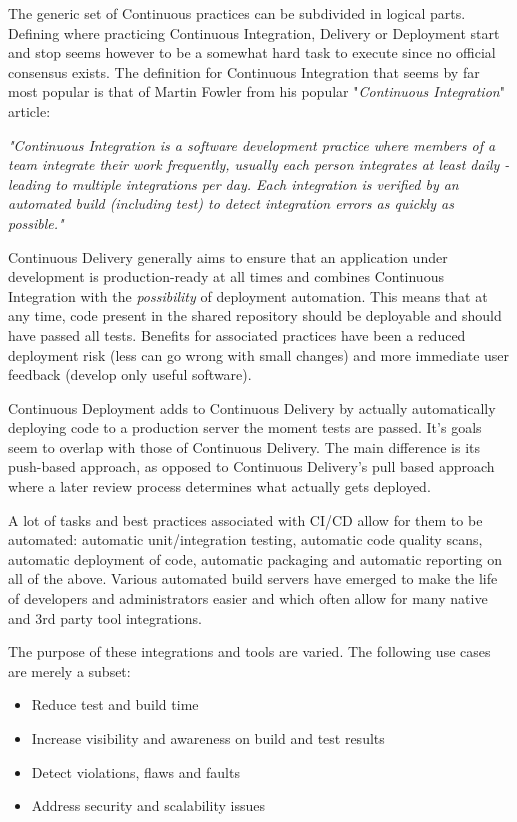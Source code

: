 The generic set of Continuous practices can be subdivided in logical parts. Defining where practicing Continuous Integration, Delivery or Deployment start and stop seems however to be a somewhat hard task to execute since no official consensus exists. The definition for Continuous Integration that seems by far most popular is that of Martin Fowler from his popular "\textit{Continuous Integration}" article:

\textit{"Continuous Integration is a software development practice where members of a team integrate their work frequently, usually each person integrates at least daily - leading to multiple integrations per day. Each integration is verified by an automated build (including test) to detect integration errors as quickly as possible."}\cite{ci-duvall,cicd-review,fowler,cd-casestudy,devops-implementation}

Continuous Delivery generally aims to ensure that an application under development is production-ready at all times and combines Continuous Integration with the \textit{possibility} of deployment automation.\cite{cicd-review,deploymentvdelivery,continuous-delivery} This means that at any time, code present in the shared repository should be deployable and should have passed all tests. Benefits for associated practices have been a reduced deployment risk (less can go wrong with small changes) and more immediate user feedback (develop only useful software).\cite{cicd-review,continuous-delivery}

Continuous Deployment adds to Continuous Delivery by actually automatically deploying code to a production server the moment tests are passed. It's goals seem to overlap with those of Continuous Delivery. The main difference is its push-based approach, as opposed to Continuous Delivery's pull based approach where a later review process determines what actually gets deployed.\cite{cicd-review,deploymentvdelivery,continuous-deployment}

\pagebreak

A lot of tasks and best practices associated with CI/CD allow for them to be automated: automatic unit/integration testing, automatic code quality scans, automatic deployment of code, automatic packaging and automatic reporting on all of the above. Various automated build servers have emerged to make the life of developers and administrators easier and which often allow for many native and 3rd party tool integrations.

The purpose of these integrations and tools are varied. The following use cases are merely a subset:\cite{cicd-review} 
\begin{itemize}
    \item Reduce test and build time 
    \item Increase visibility and awareness on build and test results
    \item Detect violations, flaws and faults
    \item Address security and scalability issues
\end{itemize}

